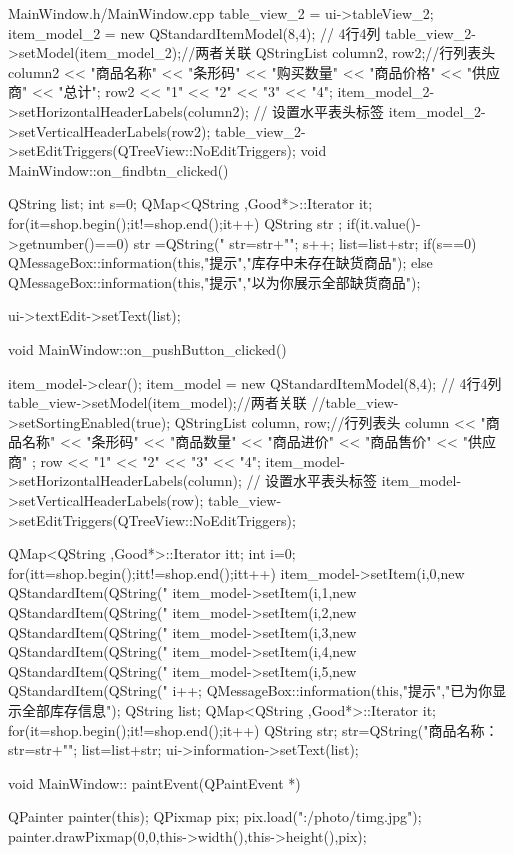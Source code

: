 \documentclass[
   projtype=report, %
   output=print,     %
  ]{nwafuprojrep}
\begin{document}
\begin{langCVOne}[C++][code10][QT]{MainWindow.h/MainWindow.cpp}
{    
    table_view_2 = ui->tableView_2;
    item_model_2 = new QStandardItemModel(8,4);  // 4行4列
    table_view_2->setModel(item_model_2);//两者关联
    QStringList column2, row2;//行列表头
    column2 << "商品名称" << "条形码" << "购买数量"  << "商品价格"  << "供应商" << "总计";
    row2 << "1" << "2" << "3" << "4";
    item_model_2->setHorizontalHeaderLabels(column2);                // 设置水平表头标签
    item_model_2->setVerticalHeaderLabels(row2);
    table_view_2->setEditTriggers(QTreeView::NoEditTriggers);
}
void MainWindow::on_findbtn_clicked()
{
    QString list;
    int s=0;
    QMap<QString ,Good*>::Iterator it;
    for(it=shop.begin();it!=shop.end();it++)
    {
        QString str ;
        if(it.value()->getnumber()==0)
        {          
            str =QString("%
            str=str+"\n";
            s++;
        }
        list=list+str;
    }
    if(s==0) QMessageBox::information(this,"提示","库存中未存在缺货商品");
    else QMessageBox::information(this,"提示","以为你展示全部缺货商品");
    
    ui->textEdit->setText(list);
}
void MainWindow::on_pushButton_clicked()
{
    item_model->clear();
    item_model = new QStandardItemModel(8,4);  // 4行4列
    table_view->setModel(item_model);//两者关联
    //table_view->setSortingEnabled(true);
    QStringList column, row;//行列表头
    column << "商品名称" << "条形码" << "商品数量" << "商品进价" << "商品售价"  << "供应商" ;
    row << "1" << "2" << "3" << "4";
    item_model->setHorizontalHeaderLabels(column);                // 设置水平表头标签
    item_model->setVerticalHeaderLabels(row);
    table_view->setEditTriggers(QTreeView::NoEditTriggers);
    
    QMap<QString ,Good*>::Iterator itt;
    int i=0;
    for(itt=shop.begin();itt!=shop.end();itt++)
    {
        item_model->setItem(i,0,new QStandardItem(QString("%
        item_model->setItem(i,1,new QStandardItem(QString("%
        item_model->setItem(i,2,new QStandardItem(QString("%
        item_model->setItem(i,3,new QStandardItem(QString("%
        item_model->setItem(i,4,new QStandardItem(QString("%
        item_model->setItem(i,5,new QStandardItem(QString("%
        i++;
    }
    QMessageBox::information(this,"提示","已为你显示全部库存信息");
    QString list;
    QMap<QString ,Good*>::Iterator it;
    for(it=shop.begin();it!=shop.end();it++)
    {
        QString str;
        str=QString("商品名称：%
        str=str+"\n";
        list=list+str;
    }
    ui->information->setText(list);
}
void MainWindow:: paintEvent(QPaintEvent *)
{
    QPainter painter(this);
    QPixmap pix;
    pix.load(":/photo/timg.jpg");
    painter.drawPixmap(0,0,this->width(),this->height(),pix);
    
}
\end{langCVOne}
\end{document}
